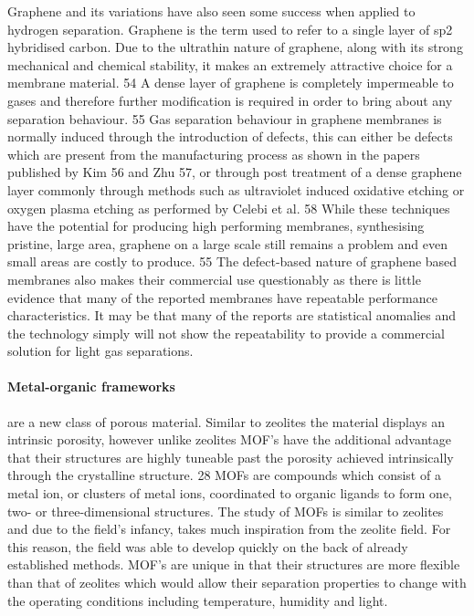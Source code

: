 Graphene and its variations have also seen some success when applied to hydrogen separation. 
Graphene is the term used to refer to a single layer of sp2 hybridised carbon. Due to the 
ultrathin nature of graphene, along with its strong mechanical and chemical stability, it 
makes an extremely attractive choice for a membrane material. 54 A dense layer of graphene 
is completely impermeable to gases and therefore further modification is required in order 
to bring about any separation behaviour. 55 Gas separation behaviour in graphene membranes 
is normally induced through the introduction of defects, this can either be defects which 
are present from the manufacturing process as shown in the papers published by Kim 56 and Zhu 57, 
or through post treatment of a dense graphene layer commonly through methods such as 
ultraviolet induced oxidative etching or oxygen plasma etching as performed by Celebi et al. 
58 While these techniques have the potential for producing high performing membranes, 
synthesising pristine, large area, graphene on a large scale still remains a problem and 
even small areas are costly to produce. 55  The defect-based nature of graphene based 
membranes also makes their commercial use questionably as there is little evidence that 
many of the reported membranes have repeatable performance characteristics. It may be that 
many of the reports are statistical anomalies and the technology simply will not show the 
repeatability to provide a commercial solution for light gas separations.

\paragraph{Metal-organic frameworks} are a new class of porous material. Similar to zeolites 
the material displays an intrinsic porosity, however unlike zeolites MOF’s have the additional 
advantage that their structures are highly tuneable past the porosity achieved intrinsically 
through the crystalline structure. 28 MOFs are compounds which consist of a metal ion, or 
clusters of metal ions, coordinated to organic ligands to form one, two- or three-dimensional 
structures. The study of MOFs is similar to zeolites and due to the field’s infancy, takes 
much inspiration from the zeolite field. For this reason, the field was able to develop 
quickly on the back of already established methods. MOF’s are unique in that their structures 
are more flexible than that of zeolites which would allow their separation properties to 
change with the operating conditions including temperature, humidity and light. 

